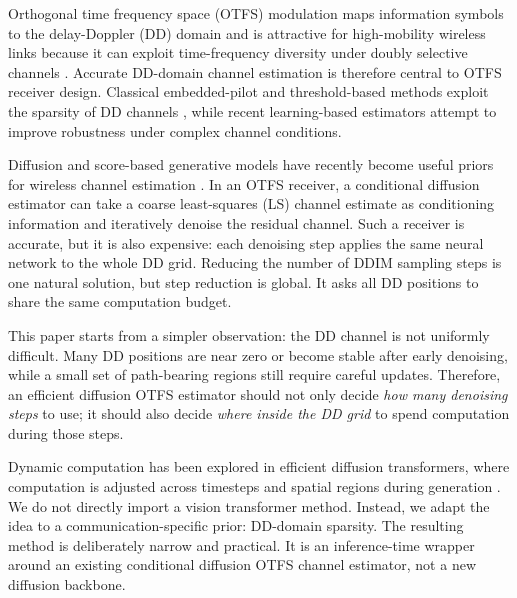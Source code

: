 \documentclass[10pt,journal]{IEEEtran}
\begin{document}
Orthogonal time frequency space (OTFS) modulation maps information symbols to
the delay-Doppler (DD) domain and is attractive for high-mobility wireless
links because it can exploit time-frequency diversity under doubly selective
channels \cite{hadani2017otfs}. Accurate DD-domain channel estimation is
therefore central to OTFS receiver design. Classical embedded-pilot and
threshold-based methods exploit the sparsity of DD channels \cite{raviteja2019otfs_ce},
while recent learning-based estimators attempt to improve robustness under
complex channel conditions.

Diffusion and score-based generative models have recently become useful priors
for wireless channel estimation \cite{arvinte2023score_channel}. In an OTFS
receiver, a conditional diffusion estimator can take a coarse least-squares
(LS) channel estimate as conditioning information and iteratively denoise the
residual channel. Such a receiver is accurate, but it is also expensive: each
denoising step applies the same neural network to the whole DD grid. Reducing
the number of DDIM sampling steps \cite{song2021ddim} is one natural solution,
but step reduction is global. It asks all DD positions to share the same
computation budget.

This paper starts from a simpler observation: the DD channel is not uniformly
difficult. Many DD positions are near zero or become stable after early
denoising, while a small set of path-bearing regions still require careful
updates. Therefore, an efficient diffusion OTFS estimator should not only
decide \emph{how many denoising steps} to use; it should also decide
\emph{where inside the DD grid} to spend computation during those steps.

Dynamic computation has been explored in efficient diffusion transformers, where
computation is adjusted across timesteps and spatial regions during generation
\cite{zhao2025dydit}. We do not directly import a vision transformer method.
Instead, we adapt the idea to a communication-specific prior: DD-domain
sparsity. The resulting method is deliberately narrow and practical. It is an
inference-time wrapper around an existing conditional diffusion OTFS channel
estimator, not a new diffusion backbone.
\end{document}
